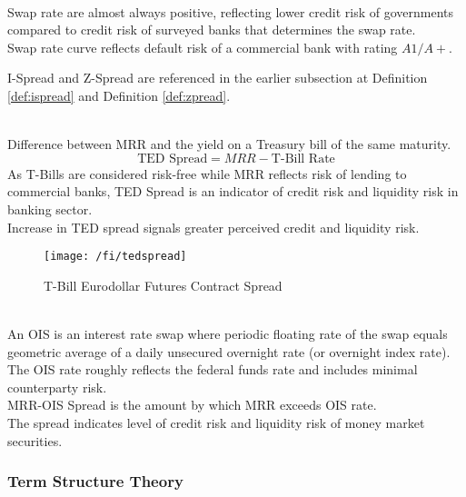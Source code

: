 \begin{remark} \\
Swap rate are almost always positive, reflecting lower credit risk of governments compared to credit risk of surveyed banks that determines the swap rate.\\
Swap rate curve reflects default risk of a commercial bank with rating $A1/A+$.
\end{remark}

I-Spread and Z-Spread are referenced in the earlier subsection at Definition \ref{def:ispread} and Definition \ref{def:zpread}.

\begin{definition} \\
Difference between MRR and the yield on a Treasury bill of the same maturity.
\begin{equation}
\text{TED Spread} = MRR - \text{T-Bill Rate} \nonumber
\end{equation}
As T-Bills are considered risk-free while MRR reflects risk of lending to commercial banks, TED Spread is an indicator of credit risk and liquidity risk in banking sector.\\
Increase in TED spread signals greater perceived credit and liquidity risk.
\end{definition}

\begin{figure}[H]
\centering
\texttt{[image: /fi/tedspread]}
\caption{T-Bill Eurodollar Futures Contract Spread}
\end{figure}

\begin{definition} \\
An OIS is an interest rate swap where periodic floating rate of the swap equals geometric average of a daily unsecured overnight rate (or overnight index rate).\\
The OIS rate roughly reflects the federal funds rate and includes minimal counterparty risk.\\
MRR-OIS Spread is the amount by which MRR exceeds OIS rate.\\
The spread indicates level of credit risk and liquidity risk of money market securities.
\end{definition}

\subsubsection{Term Structure Theory}

